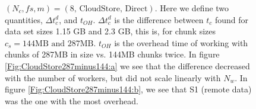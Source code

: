 \documentclass{rspublic}
\begin{document}
\begin{figure}
\begin{center}
\caption{$(N_c, f\!s, m) = (\mbox{8, CloudStore, Direct})$. Here
we define two quantities, $\Delta t_c^d$, and $t_{OH}$. $\Delta t_c^d$
is the difference between $t_c$ found for data set sizes 1.15 GB and
2.3 GB, this is, for chunk sizes $c_s = 144\mbox{MB and } 287\mbox{MB}$.
$t_{OH}$ is the overhead time of working with chunks of 287MB in size
vs. 144MB chunks twice. In figure \ref{Fig:CloudStore287minus144:a} we
see that the difference decreased with the number of workers, but did
not scale linearly with $N_w$. In figure
\ref{Fig:CloudStore287minus144:b}, we see that S1 (remote data)
was the one with the most overhead.}
\label{Fig:CloudStore287minus144}
\end{center}
\end{figure}
\end{document}

